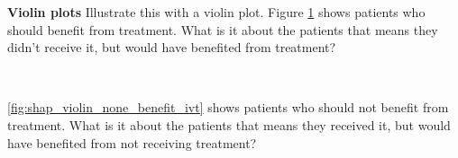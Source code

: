 \textbf{Violin plots}
Illustrate this with a violin plot. Figure \ref{fig:shap_violin_all_benefit_ivt} shows patients who should benefit from treatment. What is it about the patients that means they didn't receive it, but would have benefited from treatment?

\begin{figure}
\\
\caption{}
\label{fig:shap_violin_all_benefit_ivt}
\end{figure}

\ref{fig:shap_violin_none_benefit_ivt} shows patients who should not benefit from treatment. What is it about the patients that means they received it, but would have benefited from not receiving treatment?


